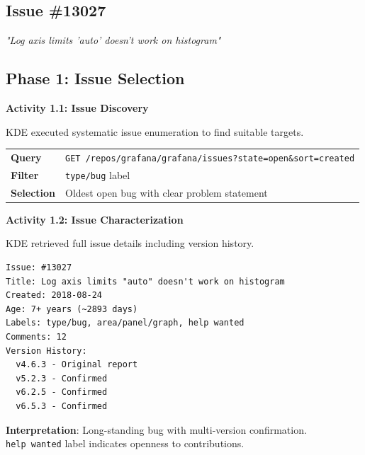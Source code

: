 \documentclass[
    11pt,
    a4paper,
    oneside,
    parskip=full,
    headings=big,
    bibliography=totoc
]{scrartcl}
\newcommand{\code}[1]{\texttt{#1}}
\begin{document}
\subsection{Issue \#13027}

{\itshape\color{black70}"Log axis limits 'auto' doesn't work on histogram"}

\subsection*{Phase 1: Issue Selection}

\begin{actionbox}
    \textbf{Activity 1.1: Issue Discovery}
    
    KDE executed systematic issue enumeration to find suitable targets.
    
    \vspace{0.3cm}
    \begin{tabular}{p{3cm}p{10cm}}
        \textbf{Query} & \code{GET /repos/grafana/grafana/issues?state=open\&sort=created} \\
        \textbf{Filter} & \code{type/bug} label \\
        \textbf{Selection} & Oldest open bug with clear problem statement \\
    \end{tabular}
\end{actionbox}

\begin{actionbox}
    \textbf{Activity 1.2: Issue Characterization}
    
    KDE retrieved full issue details including version history.
    
    \vspace{0.3cm}
    \begin{evidencebox}
    \begin{verbatim}
Issue: #13027
Title: Log axis limits "auto" doesn't work on histogram
Created: 2018-08-24
Age: 7+ years (~2893 days)
Labels: type/bug, area/panel/graph, help wanted
Comments: 12
Version History:
  v4.6.3 - Original report
  v5.2.3 - Confirmed
  v6.2.5 - Confirmed
  v6.5.3 - Confirmed
    \end{verbatim}
    \end{evidencebox}
    
    \vspace{0.3cm}
    \textbf{Interpretation}: Long-standing bug with multi-version confirmation.
    \code{help\ wanted} label indicates openness to contributions.
\end{actionbox}
\end{document}
